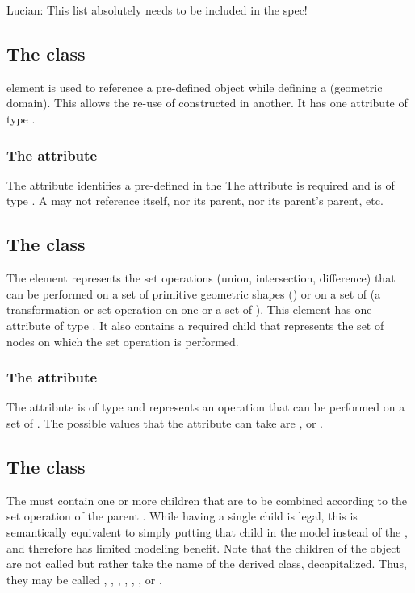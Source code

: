 {\color{red} Lucian: \notice This list absolutely needs to be included in the spec!}


\subsection{The  class}
\label{CSGPseudoPrimitive-class}
\CSGPseudoPrimitive element is used to reference a pre-defined \CSGObject object while defining a \CSGObject (geometric domain). This allows the re-use of constructed \CSGObject in another. It has one attribute of type .

\subsubsection{The  attribute}
The  attribute identifies a pre-defined \CSGObject in the \CSGeometry The attribute is required and is of type .  A \CSGObject may not reference itself, nor its parent, nor its parent's parent, etc.


\subsection{The  class}
\label{CSGSetOperator-class}
The \CSGSetOperator element represents the set operations (union, intersection, difference) that can be performed on a set of primitive geometric shapes (\CSGPrimitives) or on a set of \CSGNodes (a transformation or set operation on one or a set of \CSGPrimitives). This element has one attribute of type . It also contains a required child \ListOfCSGNodes that represents the set of nodes on which the set operation is performed.

\subsubsection{The  attribute}
The  attribute is of type  and represents an operation that can be performed on a set of \CSGNodes. The possible values that the  attribute can take are ,  or .


\subsection{The  class}
\label{ListOfCSGNodes-class}
The \ListOfCSGNodes must contain one or more  children that are to be combined according to the set operation of the parent \CSGSetOperator.  While having a single child is legal, this is semantically equivalent to simply putting that child in the model instead of the \CSGSetOperator, and therefore has limited modeling benefit.  Note that the children of the \ListOfCSGNodes object are not called  but rather take the name of the derived class, decapitalized.  Thus, they may be called , , , , , , or .


